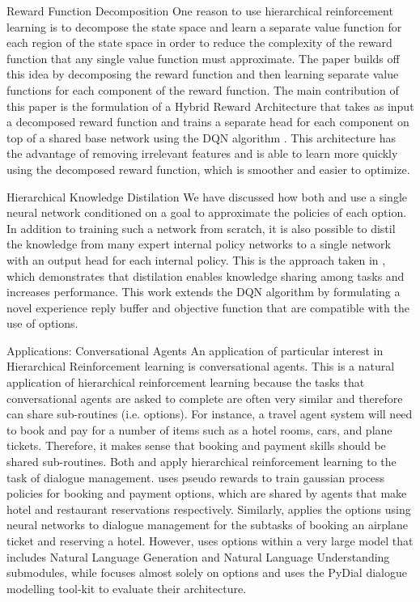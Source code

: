\begin{subsection}{Reward Function Decomposition}
One reason to use hierarchical reinforcement learning is
to decompose the state space and learn a separate value function
for each region of the state space in order to reduce the complexity of the reward
function that any single value function must approximate. The paper
\cite{Seijen} builds off this idea
by decomposing the reward function and then learning separate value functions for
each component of the reward function. The main contribution of this paper is
the formulation of a Hybrid Reward Architecture that takes as input a decomposed
reward function and trains a separate head for each component on top of a shared base
network using the DQN algorithm \cite{Mnih}. This architecture has the advantage of
removing irrelevant features and is able to learn more quickly using the decomposed
reward function, which is smoother and easier to optimize.
\end{subsection}

\begin{subsection}{Hierarchical Knowledge Distilation}
We have discussed how both \cite{Florensa} and \cite{Tejas}
use a single neural network conditioned on a goal to approximate the policies of each option.
In addition to training such a network from scratch, it is also possible to distil
the knowledge from many expert internal policy networks to a single network with an
output head for each internal policy. This is the approach taken in \cite{Tessler}, which
demonstrates that distilation enables knowledge sharing among tasks and increases performance.
This work extends the DQN algorithm by formulating a novel
experience reply buffer and objective function that are compatible with the use
of options.
\end{subsection}

\begin{subsection}{Applications: Conversational Agents}
An application of particular interest in Hierarchical Reinforcement learning
is conversational agents. This is a natural application of hierarchical
reinforcement learning because the tasks that conversational agents are asked
to complete are often very similar and therefore can share sub-routines
(i.e. options). For instance, a travel agent system will need to book
and pay for a number of items such as a hotel rooms, cars, and plane tickets.
Therefore, it makes sense that booking and payment skills should be shared sub-routines.
Both \cite{Peng} and \cite{Budzianowski} apply hierarchical
reinforcement learning to the task of dialogue management. \cite{Budzianowski}
uses pseudo rewards to train gaussian process policies for booking and payment options,
which are shared by agents that make hotel and restaurant reservations respectively.
Similarly, \cite{Peng} applies the options using neural networks
to dialogue management for the subtasks of booking an airplane ticket and reserving a hotel.
However, \cite{Peng} uses options within a very large model that
includes Natural Language Generation and Natural Language Understanding
submodules, while \cite{Budzianowski} focuses almost solely on options and
uses the PyDial dialogue modelling tool-kit to evaluate their architecture.
\end{subsection}



